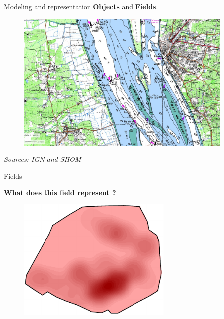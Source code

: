 \begin{frame}{Modeling and representation}
\textbf{Objects} and  \textbf{Fields}.

\begin{figure}
\includegraphics[width=10.5cm]{FortMedoc.jpg}
\end{figure}

\footnotesize
\textit{Sources: IGN and SHOM }
\normalsize

\end{frame}



\begin{frame}{Fields}

\textbf{What does this field represent ?}

\begin{figure}
\includegraphics[width=7.5cm]{Champs.pdf}
\end{figure}

\end{frame}



